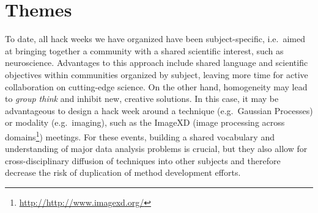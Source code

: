 \section*{Themes}

To date, all hack weeks we have organized have been subject-specific, i.e.\ aimed at bringing together a community with a shared scientific interest, such as neuroscience.
Advantages to this approach include shared language and scientific objectives within communities organized by subject, leaving more time for active collaboration on cutting-edge science.
On the other hand, homogeneity may lead to \textit{group think} and inhibit new, creative solutions. 
In this case, it may be advantageous to design a hack week around a technique (e.g.\ Gaussian Processes) or modality (e.g.\ imaging), such as the ImageXD (image processing across domains\footnote{\url{http://http://www.imagexd.org/}}) meetings. 
For these events, building a shared vocabulary and understanding of major data analysis problems is crucial, but they also allow for cross-disciplinary diffusion of techniques into other subjects and therefore decrease the risk of duplication of method development efforts.